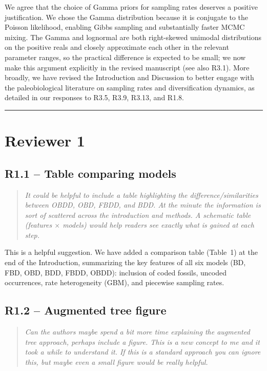 \documentclass[11pt]{article}
\newenvironment{RC}{\begin{quote}\itshape}{\end{quote}}
\newcommand{\response}[1]{\noindent\textcolor{resp}{#1}\medskip}
\begin{document}
\response{We agree that the choice of Gamma priors for sampling rates deserves a positive justification. We chose the Gamma distribution because it is conjugate to the Poisson likelihood, enabling Gibbs sampling and substantially faster MCMC mixing. The Gamma and lognormal are both right-skewed unimodal distributions on the positive reals and closely approximate each other in the relevant parameter ranges, so the practical difference is expected to be small; we now make this argument explicitly in the revised manuscript (see also R3.1). More broadly, we have revised the Introduction and Discussion to better engage with the paleobiological literature on sampling rates and diversification dynamics, as detailed in our responses to R3.5, R3.9, R3.13, and R1.8.}


\bigskip\noindent\rule{\linewidth}{0.8pt}\bigskip

\section*{Reviewer 1}

\subsection*{R1.1 -- Table comparing models}

\begin{RC}
It could be helpful to include a table highlighting the difference/similarities between OBDD, OBD, FBDD, and BDD. At the minute the information is sort of scattered across the introduction and methods. A schematic table (features $\times$ models) would help readers see exactly what is gained at each step.
\end{RC}

\response{This is a helpful suggestion. We have added a comparison table (Table~1) at the end of the Introduction, summarizing the key features of all six models (BD, FBD, OBD, BDD, FBDD, OBDD): inclusion of coded fossils, uncoded occurrences, rate heterogeneity (GBM), and piecewise sampling rates.}

\subsection*{R1.2 -- Augmented tree figure}

\begin{RC}
Can the authors maybe spend a bit more time explaining the augmented tree approach, perhaps include a figure. This is a new concept to me and it took a while to understand it. If this is a standard approach you can ignore this, but maybe even a small figure would be really helpful.
\end{RC}
\end{document}
